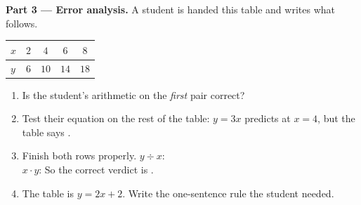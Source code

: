 \documentclass[10pt]{article}
\begin{document}
\begin{tcolorbox}[colback=white, colframe=black!40, title=\textbf{Tier A --- Approaching Proficiency},
    fonttitle=\bfseries, arc=1.5mm, left=3mm, right=3mm, top=2mm, bottom=2mm, breakable]
\vspace{5pt}
\textbf{Part 3 --- Error analysis.} A student is handed this table and writes what follows.
\begin{center}
\renewcommand{\arraystretch}{1.25}
\begin{tabular}{|l|c|c|c|c|}
\hline
\rowcolor{forestbg}
$x$ & $2$ & $4$ & $6$ & $8$ \\ \hline
$y$ & $6$ & $10$ & $14$ & $18$ \\ \hline
\end{tabular}
\end{center}
\vspace{2pt}
\begin{center}
\end{center}
\begin{enumerate}[label=(\alph*), leftmargin=2.1em, itemsep=5pt]
  \item Is the student's arithmetic on the \emph{first} pair correct? \blank{1.0cm}
  \item Test their equation on the rest of the table: $y=3x$ predicts \blank{1.0cm} at $x=4$, but
        the table says \blank{1.0cm}.
  \item Finish both rows properly. \; $y\div x$: \blank{4.4cm} \\
        $x\cdot y$: \blank{4.4cm} \; So the correct verdict is \blank{2.0cm}.
  \item The table is $y=2x+2$. Write the one-sentence rule the student needed. 
\end{enumerate}
\end{tcolorbox}
\end{document}
